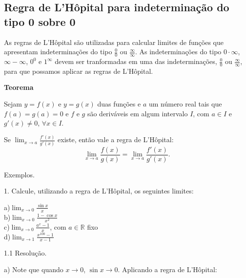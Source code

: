 \documentclass{article}
\begin{document}
{\begin{newpage}
\subsection{Regra de L'Hôpital para indeterminação do tipo 0 sobre 0}
\hspace{12pt} As regras de L'Hôpital são utilizadas para calcular limites de funções que apresentam indeterminações do tipo $\displaystyle{\frac{0}{0}}$ ou $\displaystyle{\frac{\infty}{\infty }}$. As indeterminações do tipo $0\cdot\infty $, $\infty - \infty $, $0^{0}$ e $1^{\infty }$ devem ser tranformadas em uma das indeterminações, $\displaystyle{\frac{0}{0}}$ ou $\displaystyle{\frac{\infty}{\infty }}$, para que possamos aplicar as regras de L'Hôpital.
\par
\vspace{0.2cm}
\textbf{Teorema}
\par Sejam $y=f(x)$ e $y=g(x)$ duas funções e $a$ um número real tais que $f(a)=g(a)=0$ e $f$ e $g$ são deriváveis em algum intervalo $I$, com $a\in I$ e $g'(x)\neq 0$, $\forall x\in I$.
\par Se $\displaystyle{\lim_{x\to a} \frac{f'(x)}{g'(x)}}$ existe, então vale a regra de L'Hôpital:
$$\displaystyle{\lim_{x\to a} \frac{f(x)}{g(x)} = \lim_{x\to a} \frac{f'(x)}{g'(x)}}.$$
\par
\vspace{0.3cm}
Exemplos.
\par
\vspace{0.3cm}
\begin{flushleft}
1. Calcule, utilizando a regra de L'Hôpital, os seguintes limites: 
\end{flushleft}
\par
\begin{multicols}{2}
\hspace{-15pt}a)$\displaystyle{\lim_{x\to 0} \frac{\sin{x}}{x}}$ \\
b)$\displaystyle{\lim_{x\to 0} \frac{1 - \cos{x}}{x^2}}$ \\
c)$\displaystyle{\lim_{x\to 0} \frac{a^x - 1}{x}}$, com $a\in\mathbb{R}$ fixo\\
d)$\displaystyle{\lim_{x\to 1} \frac{x^{100} - 1}{x-1}}$
\end{multicols}
\par
\vspace{0.3cm}
\begin{flushleft}
1.1 Resolução.
\end{flushleft}
\par
a) Note que quando $x\rightarrow 0$, $\sin{x}\rightarrow 0$. Aplicando a regra de L'Hôpital:

\end{newpage}}
\end{document}
